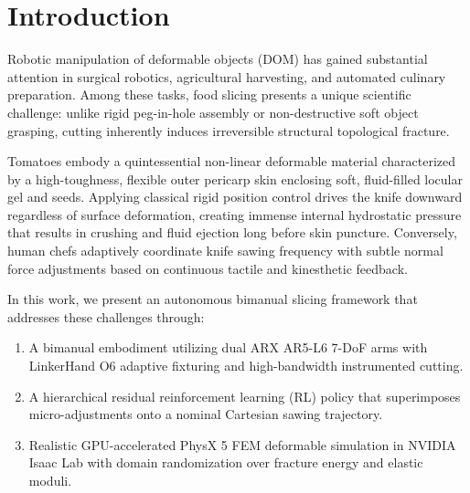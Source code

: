 \section{Introduction}
\label{sec:intro}
Robotic manipulation of deformable objects (DOM) has gained substantial attention in surgical robotics, agricultural harvesting, and automated culinary preparation. Among these tasks, food slicing presents a unique scientific challenge: unlike rigid peg-in-hole assembly or non-destructive soft object grasping, cutting inherently induces irreversible structural topological fracture. 

Tomatoes embody a quintessential non-linear deformable material characterized by a high-toughness, flexible outer pericarp skin enclosing soft, fluid-filled locular gel and seeds. Applying classical rigid position control drives the knife downward regardless of surface deformation, creating immense internal hydrostatic pressure that results in crushing and fluid ejection long before skin puncture. Conversely, human chefs adaptively coordinate knife sawing frequency with subtle normal force adjustments based on continuous tactile and kinesthetic feedback.

In this work, we present an autonomous bimanual slicing framework that addresses these challenges through:
\begin{enumerate}
    \item A bimanual embodiment utilizing dual ARX AR5-L6 7-DoF arms with LinkerHand O6 adaptive fixturing and high-bandwidth instrumented cutting.
    \item A hierarchical residual reinforcement learning (RL) policy that superimposes micro-adjustments onto a nominal Cartesian sawing trajectory.
    \item Realistic GPU-accelerated PhysX 5 FEM deformable simulation in NVIDIA Isaac Lab with domain randomization over fracture energy and elastic moduli.
\end{enumerate}
